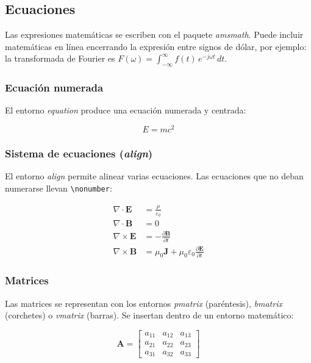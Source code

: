 \subsection{Ecuaciones}

Las expresiones matemáticas se escriben con el paquete \textit{amsmath}. Puede incluir matemáticas en línea encerrando la expresión entre signos de dólar, por ejemplo: la transformada de Fourier es $F(\omega) = \int_{-\infty}^{\infty} f(t)\,e^{-j\omega t}\,dt$.

\subsubsection*{Ecuación numerada}

El entorno \textit{equation} produce una ecuación numerada y centrada:

\begin{equation}
    E = mc^{2}
    \label{eq:einstein}
\end{equation}

\subsubsection*{Sistema de ecuaciones (\textit{align})}

El entorno \textit{align} permite alinear varias ecuaciones. Las ecuaciones que no deban numerarse llevan \lstinline|\nonumber|:

\begin{align}
    \nabla \cdot \mathbf{E} &= \frac{\rho}{\varepsilon_0} \label{eq:gauss} \\
    \nabla \cdot \mathbf{B} &= 0 \nonumber \\
    \nabla \times \mathbf{E} &= -\frac{\partial \mathbf{B}}{\partial t} \nonumber \\
    \nabla \times \mathbf{B} &= \mu_0\mathbf{J} + \mu_0\varepsilon_0\frac{\partial \mathbf{E}}{\partial t} \label{eq:ampere}
\end{align}

\subsubsection*{Matrices}

Las matrices se representan con los entornos \textit{pmatrix} (paréntesis), \textit{bmatrix} (corchetes) o \textit{vmatrix} (barras). Se insertan dentro de un entorno matemático:

\begin{equation}
    \mathbf{A} = \begin{bmatrix}
        a_{11} & a_{12} & a_{13} \\
        a_{21} & a_{22} & a_{23} \\
        a_{31} & a_{32} & a_{33}
    \end{bmatrix}
    \label{eq:matriz}
\end{equation}

